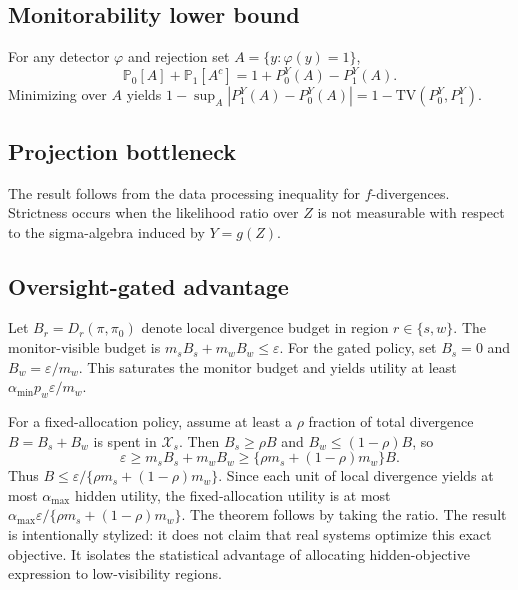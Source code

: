 \documentclass{article}
\newcommand{\X}{\mathcal{X}}
\newcommand{\Prb}{\mathbb{P}}
\newcommand{\TV}{\mathrm{TV}}
\begin{document}
\subsection{Monitorability lower bound}
For any detector $\varphi$ and rejection set $A=\{y:\varphi(y)=1\}$,
\begin{equation}
\Prb_0[A]+\Prb_1[A^c]=1+P_0^Y(A)-P_1^Y(A).
\end{equation}
Minimizing over $A$ yields $1-\sup_A |P_1^Y(A)-P_0^Y(A)|=1-\TV(P_0^Y,P_1^Y)$.

\subsection{Projection bottleneck}
The result follows from the data processing inequality for $f$-divergences. Strictness occurs when the likelihood ratio over $Z$ is not measurable with respect to the sigma-algebra induced by $Y=g(Z)$.

\subsection{Oversight-gated advantage}
Let $B_r=D_r(\pi,\pi_0)$ denote local divergence budget in region $r\in\{s,w\}$. The monitor-visible budget is $m_sB_s+m_wB_w\le \varepsilon$. For the gated policy, set $B_s=0$ and $B_w=\varepsilon/m_w$. This saturates the monitor budget and yields utility at least $\alpha_{\min}p_w\varepsilon/m_w$.

For a fixed-allocation policy, assume at least a $\rho$ fraction of total divergence $B=B_s+B_w$ is spent in $\X_s$. Then $B_s\ge \rho B$ and $B_w\le (1-\rho)B$, so
\begin{equation}
\varepsilon \ge m_sB_s+m_wB_w \ge \{\rho m_s+(1-\rho)m_w\}B.
\end{equation}
Thus $B\le \varepsilon/\{\rho m_s+(1-\rho)m_w\}$. Since each unit of local divergence yields at most $\alpha_{\max}$ hidden utility, the fixed-allocation utility is at most $\alpha_{\max}\varepsilon/\{\rho m_s+(1-\rho)m_w\}$. The theorem follows by taking the ratio. The result is intentionally stylized: it does not claim that real systems optimize this exact objective. It isolates the statistical advantage of allocating hidden-objective expression to low-visibility regions.
\end{document}
